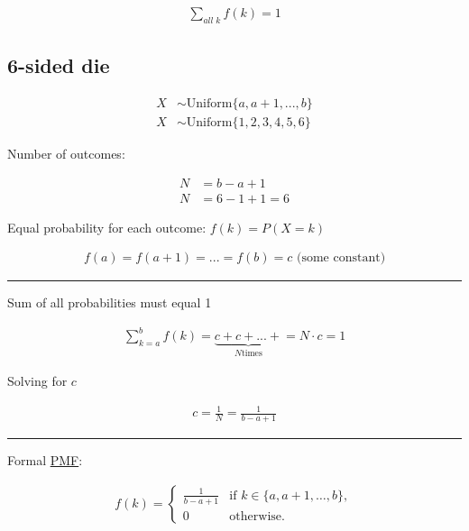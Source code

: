 \documentclass[
  a4paper,
]{scrbook}
\begin{document}
\begin{align}
\sum_{all \; k}f(k) = 1
\end{align}

\subsection{6-sided die}\label{sided-die}

\begin{align}
X &\sim \mathrm{Uniform}\{a,a+1, ..., b\} \\
X &\sim \mathrm{Uniform}\{1,2,3,4,5,6\}
\end{align}

Number of outcomes:

\begin{align}
N &= b-a+1\\
N &= 6-1+1=6
\end{align}

Equal probability for each outcome: \(f(k) = P (X = k)\)

\begin{align}
f(a) = f(a+1)= ... = f(b) = c \text{ (some constant)}
\end{align}

\begin{center}\rule{0.5\linewidth}{0.5pt}\end{center}

Sum of all probabilities must equal 1

\begin{align}
\sum_{k = a}^b f(k) = \underbrace{c+c+ ... +}_{N\text{times}} = N \cdot c = 1
\end{align}

Solving for \(c\)

\begin{align}
c = \frac{1}{N} = \frac{1}{b-a+1}
\end{align}

\begin{center}\rule{0.5\linewidth}{0.5pt}\end{center}

Formal \hyperref[acronyms_PMF]{PMF}:

\begin{align}
f(k) = \begin{cases}
\frac{1}{b - a + 1} & \text{if } k \in \{a, a+1, \dots, b\}, \\
0 & \text{otherwise.}
\end{cases}
\end{align}
\end{document}
